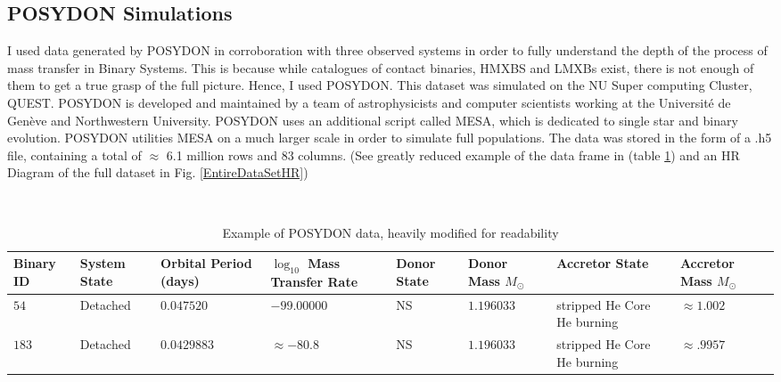 \documentclass[12pt, a4paper]{article}
\begin{document}
    \subsection{POSYDON Simulations}
         I used data generated by POSYDON \parencite{Fragos_2023} in corroboration with three observed systems in order to fully understand the depth of the process of mass transfer in Binary Systems. This is because while catalogues of contact binaries, HMXBS and LMXBs exist, there is not enough of them to get a true grasp of the full picture. Hence, I used POSYDON. This dataset was simulated on the NU Super computing Cluster, QUEST. POSYDON is developed and maintained by a team of astrophysicists and computer scientists working at the Université de Genève and Northwestern University. POSYDON uses an additional script called MESA, which is dedicated to single star and binary evolution. POSYDON utilities MESA on a much larger scale in order to simulate full populations. The data was stored in the form of a .h5 file, containing a total of $\approx$ 6.1 million rows and 83 columns. (See greatly reduced example of the data frame in (table \ref{POSYDONDataExample}) and an HR Diagram of the full dataset in Fig. \ref{EntireDataSetHR})

         \begin{table}
            \centering\
            \footnotesize
            \begin{tabularx}{\textwidth}{||X | X | X | X | X | X | X | X ||}
                \hline 
                \textbf{Binary ID} & 
                \textbf{System State} & 
                \textbf{Orbital Period (days)} & 
                \boldmath$\log_{10}$ \textbf{Mass Transfer Rate} & 
                \textbf{Donor State} & 
                \textbf{Donor Mass} $M_\odot$ & 
                \textbf{Accretor State} & 
                \textbf{Accretor Mass} $M_\odot$
                \\ \hline \hline
                $54$ & Detached & $0.047520$ & $-99.00000$ & NS & $1.196033$ & stripped He Core He burning & $\approx 1.002$ \\
                \hline
                $183$ & Detached & $0.0429883$ & $ \approx -80.8$ & NS & $1.196033$ & stripped He Core He burning & $\approx .9957$ \\
                \hline
            \end{tabularx}
            \caption{Example of POSYDON data, heavily modified for readability}
            \label{POSYDONDataExample}
        \end{table}
\end{document}

